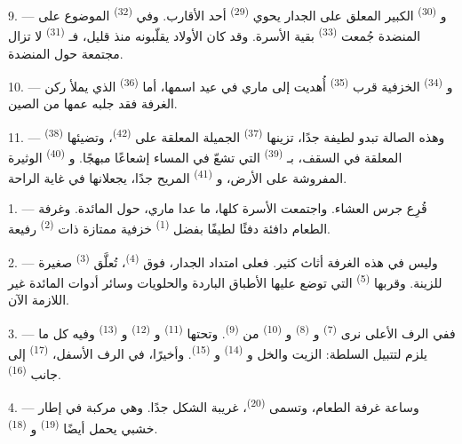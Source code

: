 9. --- و \textsuperscript{(30)} الكبير المعلق على الجدار يحوي
 \textsuperscript{(29)} أحد الأقارب. وفي 
\textsuperscript{(32)} الموضوع على المنضدة جُمعت  \textsuperscript{(33)}
بقية الأسرة. وقد كان الأولاد يقلّبونه منذ قليل، فـ
\textsuperscript{(31)} لا تزال مجتمعة حول المنضدة.

10. --- و \textsuperscript{(34)} الخزفية قرب
 \textsuperscript{(35)} أُهديت إلى ماري في عيد اسمها، أما
 \textsuperscript{(36)} الذي يملأ ركن الغرفة فقد جلبه
عمها من الصين.

11. --- وهذه الصالة تبدو لطيفة جدًا، تزينها 
\textsuperscript{(37)} الجميلة المعلقة على  \textsuperscript{(42)}،
وتضيئها  \textsuperscript{(38)} المعلقة في السقف، بـ \textsuperscript{(39)} التي تشعّ في المساء إشعاعًا مبهجًا.
و \textsuperscript{(40)} الوثيرة المفروشة على الأرض،
و \textsuperscript{(41)} المريح جدًا، يجعلانها في غاية
الراحة.

\VUsaut{3.6mm}
\VUsaut{3.0mm}

1. --- قُرِع جرس العشاء. واجتمعت الأسرة كلها، ما عدا ماري، حول المائدة.
وغرفة الطعام دافئة دفئًا لطيفًا بفضل  \textsuperscript{(1)} خزفية
ممتازة ذات  \textsuperscript{(2)} رفيعة.

2. --- وليس في هذه الغرفة أثاث كثير. فعلى امتداد الجدار، فوق
 \textsuperscript{(4)}، تُعلَّق  \textsuperscript{(3)}
صغيرة للزينة. وقربها  \textsuperscript{(5)} التي توضع
عليها الأطباق الباردة والحلويات وسائر أدوات المائدة غير اللازمة الآن.

3. --- ففي الرف الأعلى نرى  \textsuperscript{(7)}
و \textsuperscript{(8)} و \textsuperscript{(10)} من
 \textsuperscript{(9)}. وتحتها  \textsuperscript{(11)}
و \textsuperscript{(12)} و \textsuperscript{(13)}
وفيه كل ما يلزم لتتبيل السلطة: الزيت والخل و \textsuperscript{(14)}
و \textsuperscript{(15)}. وأخيرًا، في الرف الأسفل،
 \textsuperscript{(17)} إلى جانب 
\textsuperscript{(16)}.

4. --- وساعة غرفة الطعام، وتسمى  \textsuperscript{(20)}،
غريبة الشكل جدًا. وهي مركبة في إطار خشبي يحمل أيضًا 
\textsuperscript{(19)} و \textsuperscript{(18)}.

